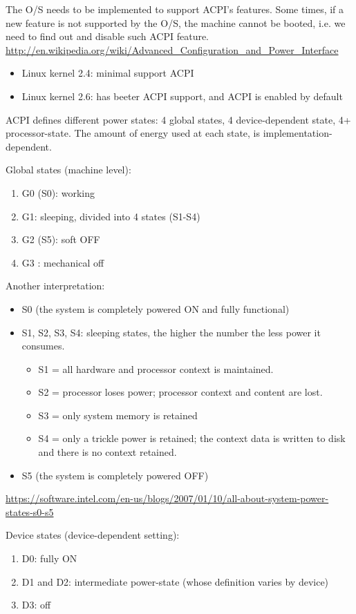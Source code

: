The O/S needs to be implemented to support ACPI's features. Some times, if a new
feature is not supported by the O/S, the machine cannot be booted, i.e. we need
to find out and disable such ACPI feature.
\url{http://en.wikipedia.org/wiki/Advanced_Configuration_and_Power_Interface}
\begin{itemize}
  \item Linux kernel 2.4: minimal support ACPI
  \item Linux kernel 2.6: has beeter ACPI support, and ACPI is enabled by
  default
\end{itemize}

ACPI defines different power states: 4 global states, 4 device-dependent state,
4+ processor-state. The amount of energy used at each state, is
implementation-dependent.

Global states (machine level):
\begin{enumerate}
  \item G0 (S0): working
  \item G1: sleeping, divided into 4 states (S1-S4)
  \item G2 (S5): soft OFF
  \item G3 : mechanical off
\end{enumerate}
Another interpretation:
\begin{itemize}
  \item S0 (the system is completely powered ON and fully functional)
  \item S1, S2, S3, S4: sleeping states, the higher the number the less power it
  consumes.
  \begin{itemize}
    \item S1 = all hardware and processor context is maintained.
    \item S2 = processor loses power; processor context and content are lost.
    \item S3 = only system memory is retained
    \item S4 = only a trickle power is retained; the context data is written to
    disk and there is no context retained.
  \end{itemize}
  \item S5 (the system is completely powered OFF)
\end{itemize}
\url{https://software.intel.com/en-us/blogs/2007/01/10/all-about-system-power-states-s0-s5}


Device states (device-dependent setting):
\begin{enumerate}
  \item D0: fully ON
  \item D1 and D2: intermediate power-state (whose definition varies by device)
  \item D3: off
\end{enumerate}

